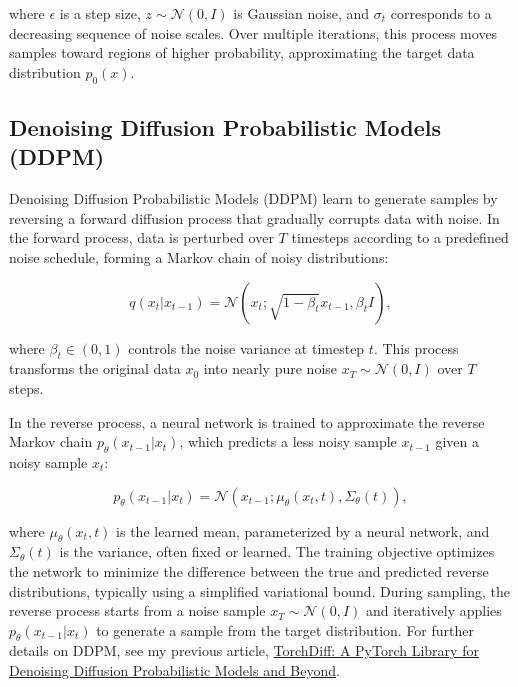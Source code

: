 \documentclass[12pt]{article}
\begin{document}
where $\epsilon$ is a step size, $z \sim \mathcal{N}(0, I)$ is Gaussian noise, and $\sigma_t$ corresponds to a decreasing sequence of noise scales. Over multiple iterations, this process moves samples toward regions of higher probability, approximating the target data distribution $p_0(x)$.

\subsection{Denoising Diffusion Probabilistic Models (DDPM)}

Denoising Diffusion Probabilistic Models (DDPM) learn to generate samples by reversing a forward diffusion process that gradually corrupts data with noise. In the forward process, data is perturbed over $T$ timesteps according to a predefined noise schedule, forming a Markov chain of noisy distributions:

\begin{equation}
    q(x_t | x_{t-1}) = \mathcal{N}(x_t; \sqrt{1 - \beta_t} x_{t-1}, \beta_t I),
\end{equation}

where $\beta_t \in (0, 1)$ controls the noise variance at timestep $t$. This process transforms the original data $x_0$ into nearly pure noise $x_T \sim \mathcal{N}(0, I)$ over $T$ steps.

In the reverse process, a neural network is trained to approximate the reverse Markov chain $p_\theta(x_{t-1} | x_t)$, which predicts a less noisy sample $x_{t-1}$ given a noisy sample $x_t$:

\begin{equation}
    p_\theta(x_{t-1} | x_t) = \mathcal{N}(x_{t-1}; \mu_\theta(x_t, t), \Sigma_\theta(t)),
\end{equation}

where $\mu_\theta(x_t, t)$ is the learned mean, parameterized by a neural network, and $\Sigma_\theta(t)$ is the variance, often fixed or learned. The training objective optimizes the network to minimize the difference between the true and predicted reverse distributions, typically using a simplified variational bound. During sampling, the reverse process starts from a noise sample $x_T \sim \mathcal{N}(0, I)$ and iteratively applies $p_\theta(x_{t-1} | x_t)$ to generate a sample from the target distribution. For further details on DDPM, see my previous article, \href{https://medium.com/@samaniloqman91/torchdiff-a-pytorch-library-for-denoising-diffusion-probabilistic-models-and-beyond-d15156e9e3b5}{TorchDiff: A PyTorch Library for Denoising Diffusion Probabilistic Models and Beyond}.
\end{document}
